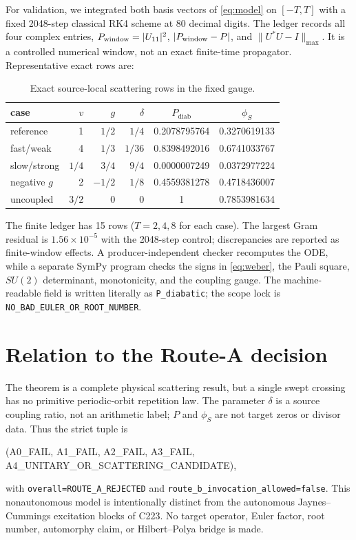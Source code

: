 \documentclass[10pt]{article}
\newcommand{\diab}{\mathrm{diab}}
\begin{document}
For validation, we integrated both basis vectors of \eqref{eq:model} on
$[-T,T]$ with a fixed 2048-step classical RK4 scheme at 80 decimal digits.
The ledger records all four complex entries, $P_{\rm window}=|U_{11}|^2$,
$|P_{\rm window}-P|$, and $\|U^*U-I\|_{\max}$.  It is a controlled numerical
window, not an exact finite-time propagator.  Representative exact rows are:

\begin{table}[h]
\centering
\small
\begin{tabular}{@{}lrrrcc@{}}
\toprule
case & $v$ & $g$ & $\delta$ & $P_\diab$ & $\phi_S$\\
\midrule
reference & 1 & $1/2$ & $1/4$ & 0.2078795764 & 0.3270619133\\
fast/weak & 4 & $1/3$ & $1/36$ & 0.8398492016 & 0.6741033767\\
slow/strong & $1/4$ & $3/4$ & $9/4$ & 0.0000007249 & 0.0372977224\\
negative $g$ & 2 & $-1/2$ & $1/8$ & 0.4559381278 & 0.4718436007\\
uncoupled & $3/2$ & 0 & 0 & 1 & 0.7853981634\\
\bottomrule
\end{tabular}
\caption{Exact source-local scattering rows in the fixed gauge.}
\label{tab:scattering}
\end{table}

The finite ledger has 15 rows ($T=2,4,8$ for each case).  The largest Gram
residual is $1.56\times10^{-5}$ with the 2048-step control; discrepancies are
reported as finite-window effects.  A producer-independent checker recomputes
the ODE, while a separate SymPy program checks the signs in \eqref{eq:weber},
the Pauli square, $SU(2)$ determinant, monotonicity, and the coupling gauge.
The machine-readable field is written literally as \texttt{P\_diabatic}; the
scope lock is \texttt{NO\_BAD\_EULER\_OR\_ROOT\_NUMBER}.

\section{Relation to the Route-A decision}

The theorem is a complete physical scattering result, but a single swept
crossing has no primitive periodic-orbit repetition law.  The parameter
$\delta$ is a source coupling ratio, not an arithmetic label; $P$ and
$\phi_S$ are not target zeros or divisor data.  Thus the strict tuple is
\begin{center}
\ttfamily (A0\_FAIL, A1\_FAIL, A2\_FAIL, A3\_FAIL,
A4\_UNITARY\_OR\_SCATTERING\_CANDIDATE),
\end{center}
with \texttt{overall=ROUTE\_A\_REJECTED} and
\texttt{route\_b\_invocation\_allowed=false}.  This nonautonomous model is
intentionally distinct from the autonomous Jaynes--Cummings excitation blocks
of C223.  No target operator, Euler factor, root number, automorphy claim, or
Hilbert--Polya bridge is made.
\end{document}
